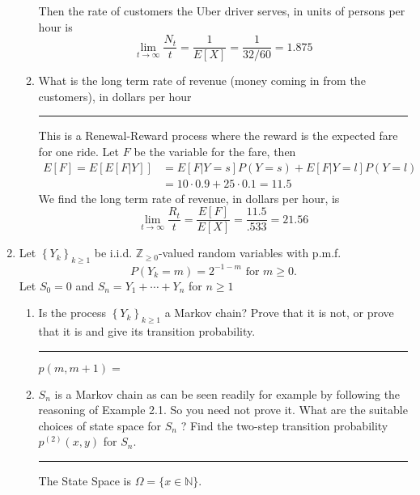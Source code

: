 \documentclass{article} %
\theoremstyle{plain}
\theoremstyle{case}
\begin{document}
\begin{enumerate}[label={\fbox{\textbf{Exercise \#\arabic* :}}}]
\begin{enumerate}
       Then the rate of customers the Uber driver serves, in units of persons per hour is
       \[ \lim_{t \to \infty} \frac{N_t}{t}  = \frac{1}{E[X]}  = \frac{1}{32/60} = 1.875 \]
     \item What is the long term rate of revenue (money coming in from the customers), in dollars per hour
\par\noindent\rule{\textwidth}{0.1pt}
        This is a Renewal-Reward process where the reward is the expected
        fare for one ride.  Let $F$ be the variable for the fare, then
       \begin{align*}
         E[F] = E[E[F|Y]] &= E[F|Y=s]P(Y=s) + E[F|Y=l]P(Y=l)   \\
                          &= 10 \cdot 0.9 + 25 \cdot 0.1 = 11.5
       \end{align*}
        We find the long term rate of revenue, in dollars per hour, is
        \[ \lim_{t \to \infty} \frac{R_t}{t} = \frac{E[F]}{E[X]} = \frac{11.5}{.533} = 21.56 \]
    \end{enumerate}

  \newpage
  \item Let $\left\{Y_k\right\}_{k \geq 1}$ be i.i.d. $\mathbb{Z}_{\geq 0}$-valued random variables with p.m.f.
    \[
      P\left(Y_k=m\right)=2^{-1-m} \text { for } m \geq 0 .
      \]
    Let $S_0=0$ and $S_n=Y_1+\cdots+Y_n$ for $n \geq 1$
    \begin{enumerate}
      \item Is the process $\left\{Y_k\right\}_{k \geq 1}$ a Markov chain? Prove that it is not, or prove that it is and give its transition probability.
\par\noindent\rule{\textwidth}{0.1pt}
      $p(m, m+1) = $
      \item  $S_n$ is a Markov chain as can be seen readily for example by following the reasoning of Example 2.1. So you need not prove it. What are the suitable choices of state space for $S_n$ ? Find the two-step transition probability $p^{(2)}(x, y)$ for $S_n$.
\par\noindent\rule{\textwidth}{0.1pt}
        The State Space is $\Omega = \{ x \in \mathbb{N} \}$.


\end{enumerate}
\end{enumerate}
\end{document}
